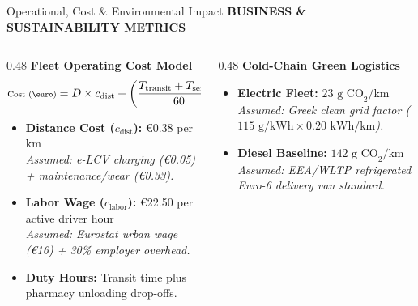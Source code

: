 \documentclass[aspectratio=169,10pt]{beamer}
\newcommand{\sectiontag}[1]{%
    {\scriptsize\bfseries\color{Accent}\MakeUppercase{#1}}\par\vspace{0.08cm}
}
\begin{document}
\begin{frame}{Operational, Cost \& Environmental Impact}
\sectiontag{Business \& Sustainability Metrics}

\vspace{-0.15cm}

\begin{columns}[T,totalwidth=\textwidth]

    \begin{column}{0.48\textwidth}
        \textbf{\color{Primary}\small Fleet Operating Cost Model}
        \vspace{0.04cm}
        \footnotesize
        \[
        \scriptsize
        \text{Cost (\euro)} = D \times c_{\text{dist}} + \left(\frac{T_{\text{transit}} + T_{\text{service}}}{60}\right) \times c_{\text{labor}}
        \]
        \begin{itemize}
            \setlength{\itemsep}{2pt}
            \scriptsize
            \item \textbf{Distance Cost ($c_{\text{dist}}$):} \euro 0.38 per km\\
            \textit{\textcolor{Muted}{Assumed: e-LCV charging (\euro 0.05) + maintenance/wear (\euro 0.33).}}
            \item \textbf{Labor Wage ($c_{\text{labor}}$):} \euro 22.50 per active driver hour\\
            \textit{\textcolor{Muted}{Assumed: Eurostat urban wage (\euro 16) + 30\% employer overhead.}}
            \item \textbf{Duty Hours:} Transit time plus pharmacy unloading drop-offs.
        \end{itemize}
    \end{column}

    \begin{column}{0.48\textwidth}
        \textbf{\color{Primary}\small Cold-Chain Green Logistics}
        \vspace{0.04cm}
        \footnotesize
        \begin{itemize}
            \setlength{\itemsep}{2pt}
            \scriptsize
            \item \textbf{Electric Fleet:} $23\text{ g CO}_2/\text{km}$\\
            \textit{\textcolor{Muted}{Assumed: Greek clean grid factor ($115\text{ g/kWh} \times 0.20\text{ kWh/km}$).}}
            \item \textbf{Diesel Baseline:} $142\text{ g CO}_2/\text{km}$\\
            \textit{\textcolor{Muted}{Assumed: EEA/WLTP refrigerated Euro-6 delivery van standard.}}
        \end{itemize}


\end{column}
\end{columns}
\end{frame}
\end{document}
